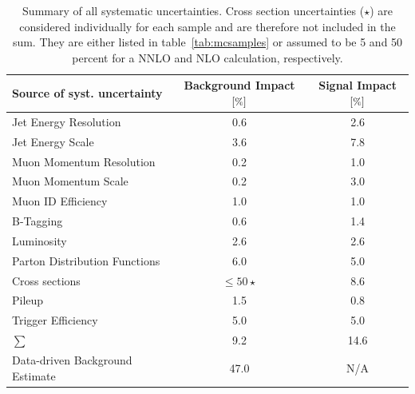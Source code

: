 \begin{table}[!htb]
  \centering
  \begin{tabular}{|l|c|c|}
    \hline
    Source of syst. uncertainty      & Background Impact $[\pct]$ & Signal Impact $[\pct]$ \\
    \hline
    \hline
    Jet Energy Resolution           & 0.6                        & 2.6                    \\
    Jet Energy Scale                & 3.6                        & 7.8                    \\
    Muon Momentum Resolution        & 0.2                        & 1.0                    \\
    Muon Momentum Scale             & 0.2                        & 3.0                    \\
    Muon ID Efficiency              & 1.0                        & 1.0                    \\
    B-Tagging                       & 0.6                        & 1.4                    \\
    \hline
    Luminosity                      & 2.6                        & 2.6                    \\
    Parton Distribution Functions   & 6.0                        & 5.0                    \\
    Cross sections                  & $\leq 50 \star$            & 8.6                    \\
    Pileup                          & 1.5                        & 0.8                    \\
    Trigger Efficiency              & 5.0                        & 5.0                    \\
    \hline
    $\sum$                          & 9.2                        & 14.6                   \\
    \hline
    \hline
    Data-driven Background Estimate & 47.0                       & N/A                    \\
    \hline
  \end{tabular}
  \caption{Summary of all systematic uncertainties. Cross section uncertainties ($\star$) are considered individually for each sample and are therefore not included in the sum. They are either listed in table~\ref{tab:mcsamples} or assumed to be 5 and 50 percent for a NNLO and NLO calculation, respectively.}
  \label{tab:sys-uncertainties}
\end{table}

